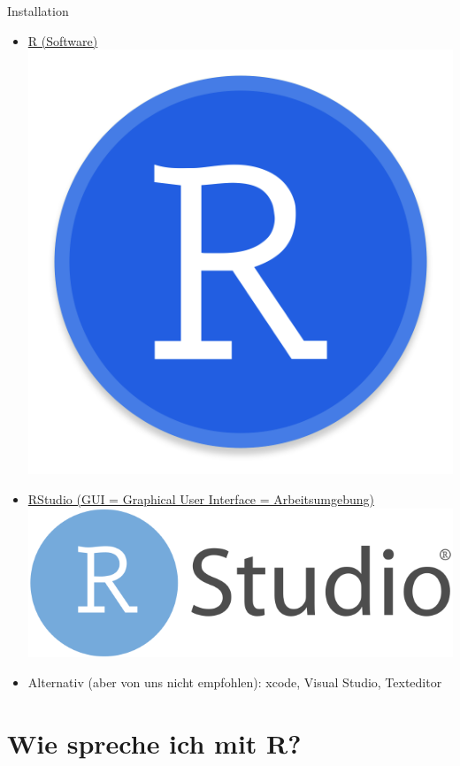 \documentclass[aspectratio = 169]{chariteBeamer}
\begin{document}
\begin{frame}[fragile]{Installation}
	\begin{itemize}
		\item \href{https://www.r-project.org/}{R (Software)  \includegraphics[scale=0.01]{include/r-logo}}
		\item \href{https://www.rstudio.com/}{RStudio (GUI = Graphical User Interface = Arbeitsumgebung)  \includegraphics[scale=0.04]{include/rstudio-logo}}
		\item Alternativ (aber von uns nicht empfohlen): xcode, Visual Studio, Texteditor
	\end{itemize}
\end{frame}


\section{Wie spreche ich mit R?}
\end{document}
